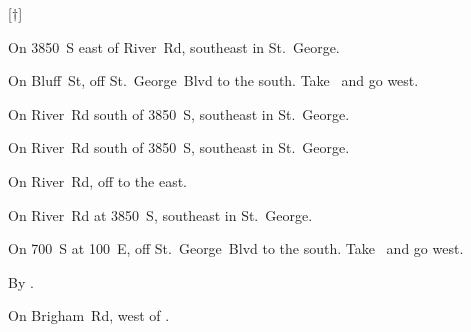 
[$\dagger$]

\begin{LocationList}

On 3850~S east of River~Rd, southeast in St.~George.

On  Bluff~St, off  St.~George~Blvd to the south.
Take~  and go west.

On River~Rd south of 3850~S, southeast in St.~George.

\Location{\GarageHQ \Garage}
On River~Rd south of 3850~S, southeast in St.~George.

On River~Rd, off   to the east.

On River~Rd at 3850~S, southeast in St.~George.

\Location{\RecruitmentAgency \Recruitment}
On 700~S at 100~E, off  St.~George~Blvd to the south.
Take~  and go west.

\Location{\TruckStop \Gas \Rest \Weigh}
By  .

On Brigham~Rd, west of  .

\end{LocationList}
